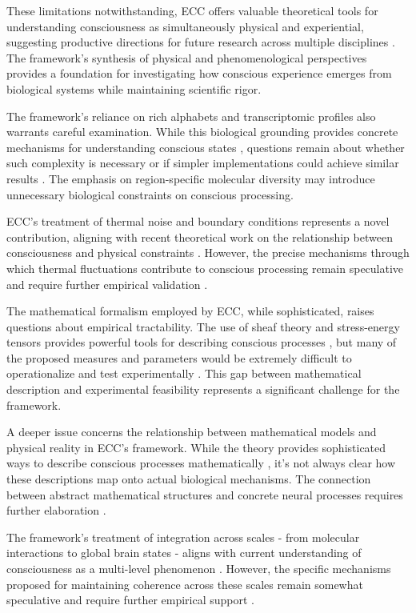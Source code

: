 These limitations notwithstanding, ECC offers valuable theoretical tools for understanding consciousness as simultaneously physical and experiential, suggesting productive directions for future research across multiple disciplines \cite{feinberg2016ancient, sheets2011primacy}. The framework's synthesis of physical and phenomenological perspectives provides a foundation for investigating how conscious experience emerges from biological systems while maintaining scientific rigor.

The framework's reliance on rich alphabets and transcriptomic profiles also warrants careful examination. While this biological grounding provides concrete mechanisms for understanding conscious states \cite{deacon2011incomplete}, questions remain about whether such complexity is necessary or if simpler implementations could achieve similar results \cite{koch2019feeling}. The emphasis on region-specific molecular diversity may introduce unnecessary biological constraints on conscious processing.

ECC's treatment of thermal noise and boundary conditions represents a novel contribution, aligning with recent theoretical work on the relationship between consciousness and physical constraints \cite{rovelli2018order}. However, the precise mechanisms through which thermal fluctuations contribute to conscious processing remain speculative and require further empirical validation \cite{penrose2016fashion}.

The mathematical formalism employed by ECC, while sophisticated, raises questions about empirical tractability. The use of sheaf theory and stress-energy tensors provides powerful tools for describing conscious processes \cite{rosen2012anticipatory}, but many of the proposed measures and parameters would be extremely difficult to operationalize and test experimentally \cite{thompson2014waking}. This gap between mathematical description and experimental feasibility represents a significant challenge for the framework.

A deeper issue concerns the relationship between mathematical models and physical reality in ECC's framework. While the theory provides sophisticated ways to describe conscious processes mathematically \cite{langer2009philosophy}, it's not always clear how these descriptions map onto actual biological mechanisms. The connection between abstract mathematical structures and concrete neural processes requires further elaboration \cite{varela2016embodied}.

The framework's treatment of integration across scales - from molecular interactions to global brain states - aligns with current understanding of consciousness as a multi-level phenomenon \cite{feinberg2016ancient}. However, the specific mechanisms proposed for maintaining coherence across these scales remain somewhat speculative and require further empirical support \cite{zahavi2014self}.

